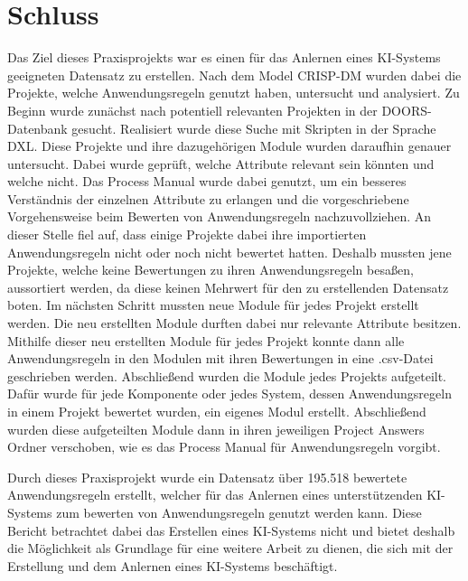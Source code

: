 \chapter{Schluss}
\label{chap:Schluss}
Das Ziel dieses Praxisprojekts war es einen für das Anlernen eines KI-Systems geeigneten Datensatz zu erstellen. Nach dem Model \ac*{CRISP-DM} wurden dabei die Projekte, welche
Anwendungsregeln genutzt haben, untersucht und analysiert. Zu Beginn wurde zunächst nach potentiell relevanten Projekten in der DOORS-Datenbank gesucht. Realisiert wurde diese Suche mit Skripten
in der Sprache \ac*{DXL}.
Diese Projekte und ihre dazugehörigen Module wurden daraufhin genauer untersucht. Dabei wurde geprüft, welche Attribute relevant sein könnten und welche nicht. Das Process Manual wurde dabei genutzt,
um ein besseres Verständnis der einzelnen Attribute zu erlangen und die vorgeschriebene Vorgehensweise beim Bewerten von Anwendungsregeln nachzuvollziehen. An dieser Stelle fiel auf, dass einige
Projekte dabei ihre importierten Anwendungsregeln nicht oder noch nicht bewertet hatten. Deshalb mussten jene Projekte, welche keine Bewertungen zu ihren Anwendungsregeln besaßen, aussortiert werden,
da diese keinen Mehrwert für den zu erstellenden Datensatz boten. Im nächsten Schritt mussten neue Module für jedes Projekt erstellt werden. Die neu erstellten Module durften dabei nur relevante Attribute
besitzen. Mithilfe dieser neu erstellten Module für jedes Projekt konnte dann alle Anwendungsregeln in den Modulen mit ihren Bewertungen in eine .csv-Datei geschrieben werden. Abschließend wurden die Module
jedes Projekts aufgeteilt. Dafür wurde für jede Komponente oder jedes System, dessen Anwendungsregeln in einem Projekt bewertet wurden, ein eigenes Modul erstellt. Abschließend wurden diese aufgeteilten 
Module dann in ihren jeweiligen Project Answers Ordner verschoben, wie es das Process Manual für Anwendungsregeln vorgibt. 

Durch dieses Praxisprojekt wurde ein Datensatz über 195.518 bewertete Anwendungsregeln erstellt, welcher für das Anlernen eines unterstützenden KI-Systems zum bewerten von Anwendungsregeln genutzt werden
kann. Diese Bericht betrachtet dabei das Erstellen eines KI-Systems nicht und bietet deshalb die Möglichkeit als Grundlage für eine weitere Arbeit zu dienen, die sich mit der Erstellung und dem Anlernen
eines KI-Systems beschäftigt.
